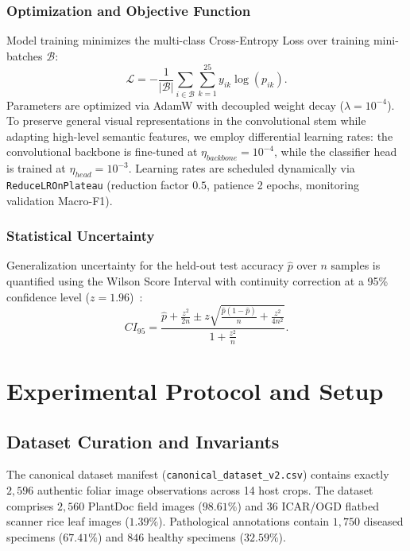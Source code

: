 \documentclass[conference,a4paper]{IEEEtran}
\begin{document}
\subsubsection{Optimization and Objective Function}
Model training minimizes the multi-class Cross-Entropy Loss over training mini-batches $\mathcal{B}$:
\begin{equation}
\mathcal{L} = -\frac{1}{|\mathcal{B}|} \sum_{i \in \mathcal{B}} \sum_{k=1}^{25} y_{ik} \log(p_{ik}).
\end{equation}
Parameters are optimized via AdamW with decoupled weight decay ($\lambda = 10^{-4}$). To preserve general visual representations in the convolutional stem while adapting high-level semantic features, we employ differential learning rates: the convolutional backbone is fine-tuned at $\eta_{backbone} = 10^{-4}$, while the classifier head is trained at $\eta_{head} = 10^{-3}$. Learning rates are scheduled dynamically via \texttt{ReduceLROnPlateau} (reduction factor $0.5$, patience 2 epochs, monitoring validation Macro-F1).

\subsubsection{Statistical Uncertainty}
Generalization uncertainty for the held-out test accuracy $\hat{p}$ over $n$ samples is quantified using the Wilson Score Interval with continuity correction at a 95\% confidence level ($z = 1.96$)~\cite{wilson1927confidence}:
\begin{equation}
CI_{95} = \frac{\hat{p} + \frac{z^2}{2n} \pm z \sqrt{\frac{\hat{p}(1 - \hat{p})}{n} + \frac{z^2}{4n^2}}}{1 + \frac{z^2}{n}}.
\end{equation}

\section{Experimental Protocol and Setup}

\subsection{Dataset Curation and Invariants}
The canonical dataset manifest (\texttt{canonical\_dataset\_v2.csv}) contains exactly $2,596$ authentic foliar image observations across 14 host crops. The dataset comprises $2,560$ PlantDoc field images ($98.61\%$) and $36$ ICAR/OGD flatbed scanner rice leaf images ($1.39\%$). Pathological annotations contain $1,750$ diseased specimens ($67.41\%$) and $846$ healthy specimens ($32.59\%$).
\end{document}
